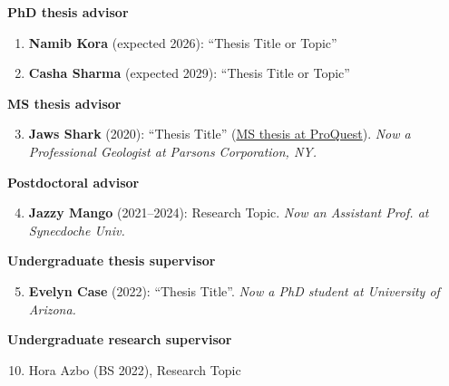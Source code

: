 \documentclass[letterpaper,11pt]{article}
\makeatletter
\renewenvironment{description}%
               {\list{}{\leftmargin=5pt %
                        \labelwidth\z@ \itemindent-\leftmargin
                        \let\makelabel\descriptionlabel}}%
               {\endlist}
\makeatother
\begin{document}
	
\vspace{-5pt}
\begin{description}

\item \textbf{PhD thesis advisor}
\vspace{-4pt}
\begin{enumerate}	
	\item \textbf{Namib Kora} (expected 2026): ``Thesis Title or Topic'' 
	\item \textbf{Casha Sharma} (expected 2029): ``Thesis Title or Topic'' 	
\end{enumerate}
	



\item \textbf{MS thesis advisor} 
\begin{enumerate}
\setcounter{enumi}{2}
	
	\item \textbf{Jaws Shark} (2020): ``Thesis Title'' 
		(\href{https://www.proquest.com/docview/2424045217/}{MS thesis at ProQuest}). \textit{Now a Professional Geologist at Parsons Corporation, NY.}
	
\end{enumerate}


\vspace{-2pt}
\item \textbf{Postdoctoral advisor} 
\begin{enumerate}
\setcounter{enumi}{3}
	\vspace{-4pt}
		\item \textbf{Jazzy Mango} (2021--2024): Research Topic.  \textit{Now an Assistant Prof. at Synecdoche Univ.}
\end{enumerate}



\vspace{-2pt}

\item \textbf{Undergraduate thesis supervisor} 
\begin{enumerate}
\setcounter{enumi}{4}
	\vspace{-4pt}
	\item \textbf{Evelyn Case} (2022): ``Thesis Title''. \textit{Now a PhD student at University of Arizona.}
\end{enumerate}

\vspace{-2pt}
\item \textbf{Undergraduate research supervisor} 
\begin{enumerate}
\setcounter{enumi}{9}
	\vspace{-4pt}
	\item Hora Azbo (BS 2022), Research Topic
\end{enumerate}


    
    
    
\end{description}
\end{document}
